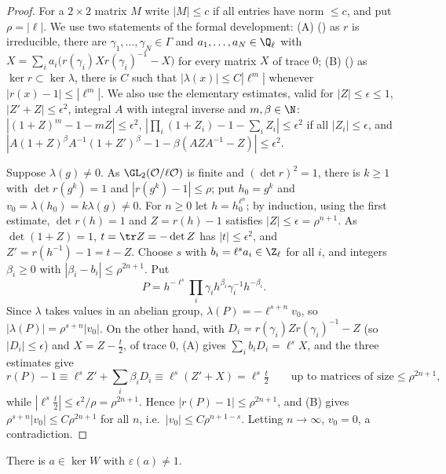 \begin{proof}
For a $2\times2$ matrix $M$ write $|M|\le c$ if all entries have norm $\le c$, and put $\rho=|\ell|$. We use two statements of the
formal development: (A) () as $r$ is
irreducible, there are $\gamma_1,\dots,\gamma_N\in\Gamma$ and $a_1,\dots,a_N\in\Q_\ell$ with $X=\sum_ia_i\bigl(r(\gamma_i)Xr(\gamma_i)^{-1}-X\bigr)$
for every matrix $X$ of trace $0$; (B) () as
$\ker r\subset\ker\lambda$, there is $C$ such that $|\lambda(x)|\le C|\ell^m|$ whenever $|r(x)-1|\le|\ell^m|$. We also use the elementary
estimates, valid for $|Z|\le\epsilon\le1$, $|Z'+Z|\le\epsilon^2$, integral $A$ with integral inverse and $m,\beta\in\N$:
$|(1+Z)^m-1-mZ|\le\epsilon^2$, $|\prod_i(1+Z_i)-1-\sum_iZ_i|\le\epsilon^2$ if all $|Z_i|\le\epsilon$, and
$|A(1+Z)^\beta A^{-1}(1+Z')^\beta-1-\beta(AZA^{-1}-Z)|\le\epsilon^2$.

Suppose $\lambda(g)\ne0$. As $\GL_2(\katoO/\ell\katoO)$ is finite and $(\det r)^2=1$, there is $k\ge1$ with $\det r(g^k)=1$ and
$|r(g^k)-1|\le\rho$; put $h_0=g^k$ and $v_0=\lambda(h_0)=k\lambda(g)\ne0$. For $n\ge0$ let $h=h_0^{\ell^n}$; by induction, using the first
estimate, $\det r(h)=1$ and $Z=r(h)-1$ satisfies $|Z|\le\epsilon=\rho^{n+1}$. As $\det(1+Z)=1$, $t=\tr Z=-\det Z$ has $|t|\le\epsilon^2$, and
$Z'=r(h^{-1})-1=t-Z$. Choose $s$ with $b_i=\ell^sa_i\in\Z_\ell$ for all $i$, and integers $\beta_i\ge0$ with
$|\beta_i-b_i|\le\rho^{2n+1}$. Put
\[
  P=h^{-\ell^s}\prod_i\gamma_ih^{\beta_i}\gamma_i^{-1}h^{-\beta_i}.
\]
Since $\lambda$ takes values in an abelian group, $\lambda(P)=-\ell^{s+n}v_0$, so $|\lambda(P)|=\rho^{s+n}|v_0|$. On the other hand, with
$D_i=r(\gamma_i)Zr(\gamma_i)^{-1}-Z$ (so $|D_i|\le\epsilon$) and $X=Z-\frac t2$, of trace $0$, (A) gives $\sum_ib_iD_i=\ell^sX$, and the three
estimates give
\[
  r(P)-1\equiv\ell^sZ'+\sum_i\beta_iD_i\equiv\ell^s(Z'+X)=\ell^s\tfrac t2\qquad\text{up to matrices of size}\le\rho^{2n+1},
\]
while $|\ell^s\frac t2|\le\epsilon^2/\rho=\rho^{2n+1}$. Hence $|r(P)-1|\le\rho^{2n+1}$, and (B) gives $\rho^{s+n}|v_0|\le C\rho^{2n+1}$ for all
$n$, i.e.\ $|v_0|\le C\rho^{n+1-s}$. Letting $n\to\infty$, $v_0=0$, a contradiction.
\end{proof}

\begin{lemma}\label{pf:kato:kereps}
There is $a\in\ker W$ with $\varepsilon(a)\ne1$.
\end{lemma}

